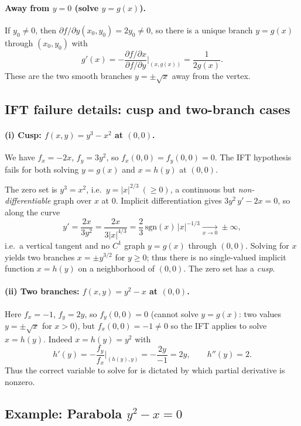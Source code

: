 \documentclass[12pt,a4paper]{article}
\theoremstyle{plain}
\theoremstyle{definition}
\theoremstyle{remark}
\theoremstyle{remark}
\begin{document}
	\paragraph{Away from $y=0$ (solve $y=g(x)$).}
	If $y_0\neq 0$, then $\partial f/\partial y(x_0,y_0)=2y_0\neq 0$, so there is a unique branch
	$y=g(x)$ through $(x_0,y_0)$ with
	\[
	g'(x)= -\frac{\partial f/\partial x}{\partial f/\partial y}\Big|_{(x,g(x))}
	= \frac{1}{2g(x)}.
	\]
	These are the two smooth branches $y=\pm\sqrt{x}$ away from the vertex.
	
	\subsection*{IFT failure details: cusp and two-branch cases}
	
	\paragraph{(i) Cusp: $f(x,y)=y^3-x^2$ at $(0,0)$.}
	We have $f_x=-2x$, $f_y=3y^2$, so $f_x(0,0)=f_y(0,0)=0$. The IFT hypothesis fails for both
	solving $y=g(x)$ and $x=h(y)$ at $(0,0)$.
	
	The zero set is $y^3=x^2$, i.e.\ $y=|x|^{2/3}\ (\ge0)$, a continuous but \emph{non-differentiable}
	graph over $x$ at $0$.
	Implicit differentiation gives $3y^2\,y'-2x=0$, so along the curve
	\[
	y'=\frac{2x}{3y^2}=\frac{2x}{3|x|^{4/3}}=\frac{2}{3}\,\mathrm{sgn}(x)\,|x|^{-1/3}\xrightarrow[x\to 0]{}\pm\infty,
	\]
	i.e.\ a vertical tangent and no $C^1$ graph $y=g(x)$ through $(0,0)$.
	Solving for $x$ yields two branches $x=\pm y^{3/2}$ for $y\ge0$; thus there is no single-valued
	implicit function $x=h(y)$ on a neighborhood of $(0,0)$. The zero set has a \emph{cusp}.
	
	\paragraph{(ii) Two branches: $f(x,y)=y^2-x$ at $(0,0)$.}
	Here $f_x=-1$, $f_y=2y$, so $f_y(0,0)=0$ (cannot solve $y=g(x)$: two values $y=\pm\sqrt{x}$ for $x>0$),
	but $f_x(0,0)=-1\neq0$ so the IFT applies to solve $x=h(y)$.
	Indeed $x=h(y)=y^2$ with
	\[
	h'(y)=-\frac{f_y}{f_x}\Big|_{(h(y),y)}=-\frac{2y}{-1}=2y,\qquad h''(y)=2.
	\]
	Thus the correct variable to solve for is dictated by which partial derivative is nonzero.
	
	\subsection*{Example: Parabola $y^2 - x = 0$}
	
\end{document}
